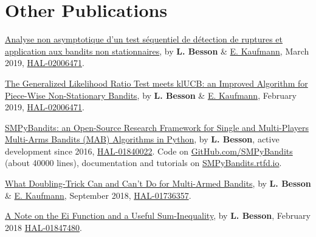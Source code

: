 \section*{Other Publications}
\renewcommand{\labelenumi}{[OP-\arabic{enumi}]}
\begin{etaremune}
\item
  \href{https://hal.inria.fr/hal-02006471/document}{Analyse non asymptotique d'un test séquentiel de détection de ruptures et application aux bandits non stationnaires}, by \textbf{L. Besson} \&
  \href{http://chercheurs.lille.inria.fr/ekaufman/research.html}{E.
  Kaufmann}, March 2019,
  \href{https://hal.inria.fr/hal-02006471}{HAL-02006471}.
  \cite{Besson2019Gretsi}
\item
  \href{https://hal.inria.fr/hal-02006471/document}{The Generalized Likelihood Ratio Test meets klUCB: an Improved Algorithm for Piece-Wise Non-Stationary Bandits}, by \textbf{L. Besson} \&
  \href{http://chercheurs.lille.inria.fr/ekaufman/research.html}{E.
  Kaufmann}, February 2019,
  \href{https://hal.inria.fr/hal-02006471}{HAL-02006471}.
  \cite{Besson2019GLRT}
\item
	\href{https://hal.inria.fr/hal-01840022/document}{SMPyBandits: an
	Open-Source Research Framework for Single and Multi-Players Multi-Arms
	Bandits (MAB) Algorithms in Python}, by \textbf{L. Besson},
	active development since 2016,
	\href{https://hal.inria.fr/hal-01840022}{HAL-01840022}. Code on
	\href{https://GitHub.com/SMPyBandits/SMPyBandits}{GitHub.com/SMPyBandits}
	(about 40000 lines), documentation and tutorials on
  \href{https://SMPyBandits.rtfd.io}{SMPyBandits.rtfd.io}.
  \cite{SMPyBandits,SMPyBanditsJMLR}
\item
	\href{https://hal.inria.fr/hal-01736357/document}{What Doubling-Trick
	Can and Can't Do for Multi-Armed Bandits}, by \textbf{L. Besson} \&
	\href{http://chercheurs.lille.inria.fr/ekaufman/research.html}{E.
	Kaufmann}, September 2018,
  \href{https://hal.inria.fr/hal-01736357}{HAL-01736357}.
  \cite{Besson2018DoublingTricks}
\item
	\href{https://hal.inria.fr/hal-01847480/document}{A Note on the Ei
	Function and a Useful Sum-Inequality}, by \textbf{L. Besson}, February
  2018 \href{https://hal.inria.fr/hal-01847480}{HAL-01847480}.
\end{etaremune}


